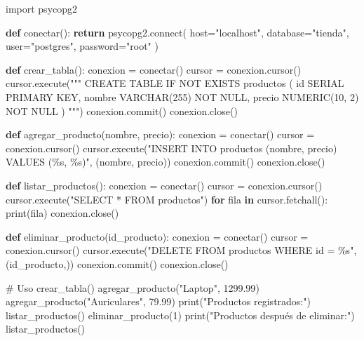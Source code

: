 \documentclass[
  a4paper,
  DIV=11,
  numbers=noendperiod,
  onepage,
  openany]{scrreprt}
\newenvironment{Shaded}{\begin{snugshade}}{\end{snugshade}}
\newcommand{\BuiltInTok}[1]{\textcolor[rgb]{0.00,0.23,0.31}{#1}}
\newcommand{\CommentTok}[1]{\textcolor[rgb]{0.37,0.37,0.37}{#1}}
\newcommand{\ControlFlowTok}[1]{\textcolor[rgb]{0.00,0.23,0.31}{\textbf{#1}}}
\newcommand{\DecValTok}[1]{\textcolor[rgb]{0.68,0.00,0.00}{#1}}
\newcommand{\ExtensionTok}[1]{\textcolor[rgb]{0.00,0.23,0.31}{#1}}
\newcommand{\FloatTok}[1]{\textcolor[rgb]{0.68,0.00,0.00}{#1}}
\newcommand{\ImportTok}[1]{\textcolor[rgb]{0.00,0.46,0.62}{#1}}
\newcommand{\KeywordTok}[1]{\textcolor[rgb]{0.00,0.23,0.31}{\textbf{#1}}}
\newcommand{\NormalTok}[1]{\textcolor[rgb]{0.00,0.23,0.31}{#1}}
\newcommand{\OperatorTok}[1]{\textcolor[rgb]{0.37,0.37,0.37}{#1}}
\newcommand{\SpecialCharTok}[1]{\textcolor[rgb]{0.37,0.37,0.37}{#1}}
\newcommand{\StringTok}[1]{\textcolor[rgb]{0.13,0.47,0.30}{#1}}
\begin{document}
\begin{Shaded}
\begin{Highlighting}[]
\ImportTok{import}\NormalTok{ psycopg2}

\KeywordTok{def}\NormalTok{ conectar():}
    \ControlFlowTok{return}\NormalTok{ psycopg2.}\ExtensionTok{connect}\NormalTok{(}
\NormalTok{        host}\OperatorTok{=}\StringTok{"localhost"}\NormalTok{,}
\NormalTok{        database}\OperatorTok{=}\StringTok{"tienda"}\NormalTok{,}
\NormalTok{        user}\OperatorTok{=}\StringTok{"postgres"}\NormalTok{,}
\NormalTok{        password}\OperatorTok{=}\StringTok{"root"}
\NormalTok{    )}

\KeywordTok{def}\NormalTok{ crear\_tabla():}
\NormalTok{    conexion }\OperatorTok{=}\NormalTok{ conectar()}
\NormalTok{    cursor }\OperatorTok{=}\NormalTok{ conexion.cursor()}
\NormalTok{    cursor.execute(}\StringTok{"""}
\StringTok{    CREATE TABLE IF NOT EXISTS productos (}
\StringTok{        id SERIAL PRIMARY KEY,}
\StringTok{        nombre VARCHAR(255) NOT NULL,}
\StringTok{        precio NUMERIC(10, 2) NOT NULL}
\StringTok{    )}
\StringTok{    """}\NormalTok{)}
\NormalTok{    conexion.commit()}
\NormalTok{    conexion.close()}

\KeywordTok{def}\NormalTok{ agregar\_producto(nombre, precio):}
\NormalTok{    conexion }\OperatorTok{=}\NormalTok{ conectar()}
\NormalTok{    cursor }\OperatorTok{=}\NormalTok{ conexion.cursor()}
\NormalTok{    cursor.execute(}\StringTok{"INSERT INTO productos (nombre, precio) VALUES (}\SpecialCharTok{\%s}\StringTok{, }\SpecialCharTok{\%s}\StringTok{)"}\NormalTok{, (nombre, precio))}
\NormalTok{    conexion.commit()}
\NormalTok{    conexion.close()}

\KeywordTok{def}\NormalTok{ listar\_productos():}
\NormalTok{    conexion }\OperatorTok{=}\NormalTok{ conectar()}
\NormalTok{    cursor }\OperatorTok{=}\NormalTok{ conexion.cursor()}
\NormalTok{    cursor.execute(}\StringTok{"SELECT * FROM productos"}\NormalTok{)}
    \ControlFlowTok{for}\NormalTok{ fila }\KeywordTok{in}\NormalTok{ cursor.fetchall():}
        \BuiltInTok{print}\NormalTok{(fila)}
\NormalTok{    conexion.close()}

\KeywordTok{def}\NormalTok{ eliminar\_producto(id\_producto):}
\NormalTok{    conexion }\OperatorTok{=}\NormalTok{ conectar()}
\NormalTok{    cursor }\OperatorTok{=}\NormalTok{ conexion.cursor()}
\NormalTok{    cursor.execute(}\StringTok{"DELETE FROM productos WHERE id = }\SpecialCharTok{\%s}\StringTok{"}\NormalTok{, (id\_producto,))}
\NormalTok{    conexion.commit()}
\NormalTok{    conexion.close()}

\CommentTok{\# Uso}
\NormalTok{crear\_tabla()}
\NormalTok{agregar\_producto(}\StringTok{"Laptop"}\NormalTok{, }\FloatTok{1299.99}\NormalTok{)}
\NormalTok{agregar\_producto(}\StringTok{"Auriculares"}\NormalTok{, }\FloatTok{79.99}\NormalTok{)}
\BuiltInTok{print}\NormalTok{(}\StringTok{"Productos registrados:"}\NormalTok{)}
\NormalTok{listar\_productos()}
\NormalTok{eliminar\_producto(}\DecValTok{1}\NormalTok{)}
\BuiltInTok{print}\NormalTok{(}\StringTok{"Productos después de eliminar:"}\NormalTok{)}
\NormalTok{listar\_productos()}
\end{Highlighting}
\end{Shaded}
\end{document}
